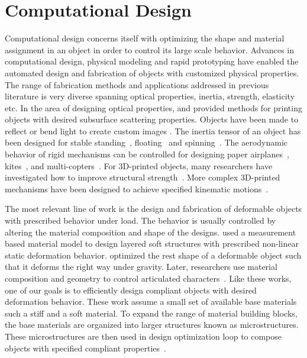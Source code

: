 \section{Computational Design}
Computational design concerns itself with optimizing the shape and material assignment in an object in order to control its large scale behavior.
Advances in computational design, physical modeling and rapid prototyping 
have enabled the automated design and fabrication of objects with customized physical properties.
The range of fabrication methods and applications addressed in previous literature is very diverse spanning optical properties, inertia, strength, elasticity etc.
In the area of designing optical properties, \citet{Hasan:2010:PRO} and
\citet{Dong:2010:FSS} provided methods for printing objects with desired subsurface scattering properties. Objects have been made to reflect or bend light to create custom images \citep{papas11goal,Weyrich:2009,kiser2013}.
The inertia tensor of an object has been designed for stable standing~\citep{Prevost:2013kb}, floating~\citep{musialski-2015}
and spinning~\citep{Bacher:2014}.
The aerodynamic behavior of rigid mechanisms can be controlled for designing paper airplanes~\citep{Umetani:2014}, kites~\citep{Martin:2015}, and multi-copters~\citep{Du:2016}.
For 3D-printed objects, many researchers have investigated how to improve structural strength~\citep{Stava:2012,Zhou:2013,Langlois:2016,Wu:2016,Ulu:2017}.
More complex 3D-printed mechanisms have been designed to achieve specified kinematic motions~\citep{Zhu:2012,Coros:2013:CDM,Bacher:2015,Megaro:2017}.

The most relevant line of work is the design and fabrication of deformable objects with prescribed behavior under load.
The behavior is usually controlled by altering the material
composition and shape of the designs.
\citet{Bickel:2010:DAF} used a measurement based material model to design 
layered soft structures with prescribed non-linear static deformation behavior.
\citet{Chen:2014:ANM} optimized the rest shape of a deformable object such that 
it deforms the right way under gravity.
Later, researchers use material composition and geometry to control 
articulated characters~\citep{Bickel:2012,Skouras13Computational}.
Like these works, one of our goals is to efficiently design compliant objects 
with desired deformation behavior. These work assume a small set of available 
base materials such a stiff and a soft material.
To expand the range of material building blocks, the base materials are 
organized into larger structures known as microstructures.
These microstructures are then used in design optimization loop to 
compose objects with specified compliant 
properties~\citep{Schumacher:2015,Panetta:2015,Zhu:2017:TTO}.

